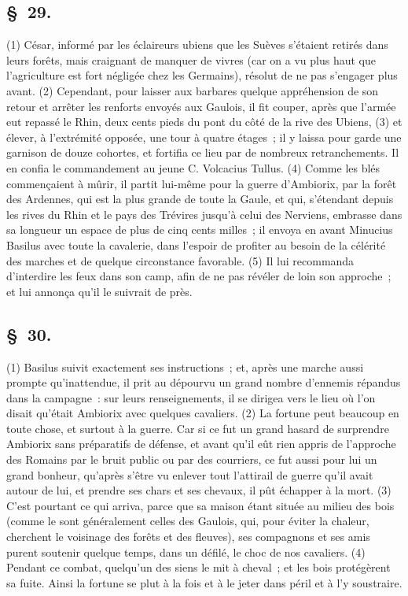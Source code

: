 \documentclass[french,twoside]{book} %
\begin{document}
\subsection[{§ 29.}]{ \textsc{§ 29.} }
\noindent (1) César, informé par les éclaireurs ubiens que les Suèves s’étaient retirés dans leurs forêts, mais craignant de manquer de vivres (car on a vu plus haut que l’agriculture est fort négligée chez les Germains), résolut de ne pas s’engager plus avant. (2) Cependant, pour laisser aux barbares quelque appréhension de son retour et arrêter les renforts envoyés aux Gaulois, il fit couper, après que l’armée eut repassé le Rhin, deux cents pieds du pont du côté de la rive des Ubiens, (3) et élever, à l’extrémité opposée, une tour à quatre étages ; il y laissa pour garde une garnison de douze cohortes, et fortifia ce lieu par de nombreux retranchements. Il en confia le commandement au jeune C. Volcacius Tullus. (4) Comme les blés commençaient à mûrir, il partit lui-même pour la guerre d’Ambiorix, par la forêt des Ardennes, qui est la plus grande de toute la Gaule, et qui, s’étendant depuis les rives du Rhin et le pays des Trévires jusqu’à celui des Nerviens, embrasse dans sa longueur un espace de plus de cinq cents milles ; il envoya en avant Minucius Basilus avec toute la cavalerie, dans l’espoir de profiter au besoin de la célérité des marches et de quelque circonstance favorable. (5) Il lui recommanda d’interdire les feux dans son camp, afin de ne pas révéler de loin son approche ; et lui annonça qu’il le suivrait de près.
\subsection[{§ 30.}]{ \textsc{§ 30.} }
\noindent (1) Basilus suivit exactement ses instructions ; et, après une marche aussi prompte qu’inattendue, il prit au dépourvu un grand nombre d’ennemis répandus dans la campagne : sur leurs renseignements, il se dirigea vers le lieu où l’on disait qu’était Ambiorix avec quelques cavaliers. (2) La fortune peut beaucoup en toute chose, et surtout à la guerre. Car si ce fut un grand hasard de surprendre Ambiorix sans préparatifs de défense, et avant qu’il eût rien appris de l’approche des Romains par le bruit public ou par des courriers, ce fut aussi pour lui un grand bonheur, qu’après s’être vu enlever tout l’attirail de guerre qu’il avait autour de lui, et prendre ses chars et ses chevaux, il pût échapper à la mort. (3) C'est pourtant ce qui arriva, parce que sa maison étant située au milieu des bois (comme le sont généralement celles des Gaulois, qui, pour éviter la chaleur, cherchent le voisinage des forêts et des fleuves), ses compagnons et ses amis purent soutenir quelque temps, dans un défilé, le choc de nos cavaliers. (4) Pendant ce combat, quelqu’un des siens le mit à cheval ; et les bois protégèrent sa fuite. Ainsi la fortune se plut à la fois et à le jeter dans péril et à l’y soustraire.
\end{document}
